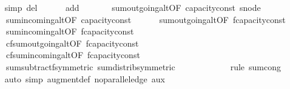 \begin{isabellebody}
\ \ \ \ \isamarkupfalse%
\ {\isacharparenleft}simp\ del{\isacharcolon}\isanewline
\ \ \ \ \ \ add{\isacharcolon}\ \isanewline
\ \ \ \ \ \ sum{\isacharunderscore}outgoing{\isacharunderscore}alt{\isacharbrackleft}OF\ capacity{\isacharunderscore}const{\isacharbrackright}\ s{\isacharunderscore}node\isanewline
\ \ \ \ \ \ sum{\isacharunderscore}incoming{\isacharunderscore}alt{\isacharbrackleft}OF\ capacity{\isacharunderscore}const{\isacharbrackright}\isanewline
\ \ \ \ \ \ sum{\isacharunderscore}outgoing{\isacharunderscore}alt{\isacharbrackleft}OF\ f{\isacharprime}{\isacharprime}{\isachardot}capacity{\isacharunderscore}const{\isacharbrackright}\isanewline
\ \ \ \ \ \ sum{\isacharunderscore}incoming{\isacharunderscore}alt{\isacharbrackleft}OF\ f{\isacharprime}{\isacharprime}{\isachardot}capacity{\isacharunderscore}const{\isacharbrackright}\isanewline
\ \ \ \ \ \ cf{\isachardot}sum{\isacharunderscore}outgoing{\isacharunderscore}alt{\isacharbrackleft}OF\ f{\isacharprime}{\isachardot}capacity{\isacharunderscore}const{\isacharbrackright}\isanewline
\ \ \ \ \ \ cf{\isachardot}sum{\isacharunderscore}incoming{\isacharunderscore}alt{\isacharbrackleft}OF\ f{\isacharprime}{\isachardot}capacity{\isacharunderscore}const{\isacharbrackright}\isanewline
\ \ \ \ \ \ sum{\isacharunderscore}subtractf{\isacharbrackleft}symmetric{\isacharbrackright}\ sum{\isachardot}distrib{\isacharbrackleft}symmetric{\isacharbrackright}\isanewline
\ \ \ \ \ \ {\isacharparenright}\isanewline
\ \ \ \ \isamarkupfalse%
\ {\isacharparenleft}rule\ sum{\isachardot}cong{\isacharparenright}\isanewline
\ \ \ \ \isamarkupfalse%
\ {\isacharparenleft}auto\ simp{\isacharcolon}\ augment{\isacharunderscore}def\ no{\isacharunderscore}parallel{\isacharunderscore}edge\ aux{}{\isacharparenright}\isanewline
\ \ \ \ \isamarkupfalse%
\isanewline
{}\isamarkupfalse%
%
\endisatagproof
{\isafoldproof}%
%
\isadelimproof
\isanewline
%
\endisadelimproof
\isanewline
\isanewline
{}\isamarkupfalse%
\ %
\isanewline
{}\isamarkupfalse%
\ %
\isanewline
%
\isadelimtheory
\isanewline
%
\endisadelimtheory
%
\isatagtheory
{}\isamarkupfalse%
\ %
%
\endisatagtheory
{\isafoldtheory}%
%
\isadelimtheory
%
\endisadelimtheory
%
\end{isabellebody}%
